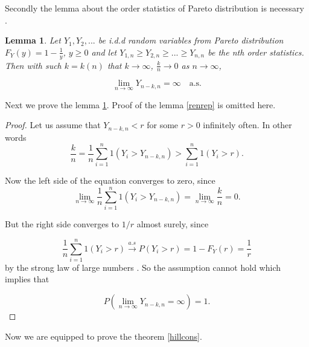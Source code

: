 \documentclass[english,12pt,a4paper,pdftex,sci,utf8]{aaltothesis} %
\newtheorem{lemma}[theorem]{Lemma}
\begin{document}
Secondly the lemma about the order statistics of Pareto distribution is necessary \cite{deHaan}.

\begin{lemma}
Let $Y_1, Y_2, ...$ be i.d.d random variables from Pareto distribution $F_Y(y)=1-\frac{1}{y}$, $y \geq 0$ and let $Y_{1,n} \geq Y_{2,n} \geq ... \geq Y_{n,n}$ be the nth order statistics. Then with such $k=k(n)$ that $k \rightarrow \infty$, $\frac{k}{n} \rightarrow 0$ as $n \rightarrow \infty$,

\begin{equation}
\lim_{n\to\infty} Y_{n-k,n} = \infty  \quad  \text{a.s}.
\end{equation}
\label{asconv}
\end{lemma}

Next we prove the lemma \ref{asconv}. Proof of the lemma \ref{renrep} is omitted here.

\begin{proof}
Let us assume that $Y_{n-k,n} < r$ for some $r > 0$ infinitely often. In other words
\begin{equation}
\frac{k}{n} = \frac{1}{n} \sum_{i=1}^{n} 1(Y_i>Y_{n-k,n}) > \sum_{i=1}^{n} 1(Y_i>r).
\end{equation}

Now the left side of the equation converges to zero, since
\begin{equation}
\lim_{n\to\infty} \frac{1}{n} \sum_{i=1}^{n} 1(Y_i>Y_{n-k,n}) = \lim_{n\to\infty} \frac{k}{n} =0.
\end{equation}

But the right side converges to $1/r$ almost surely, since

\begin{equation}
\frac{1}{n} \sum_{i=1}^{n} 1(Y_i>r) \xrightarrow{a.s} P(Y_i>r) = 1-F_Y(r) = \frac{1}{r}
\end{equation}
by the strong law of large numbers \cite{rosenthal}.
So the assumption cannot hold which implies that

\begin{equation}
P(\lim_{n\to\infty} Y_{n-k,n} = \infty)=1.
\end{equation}
\end{proof}

Now we are equipped to prove the theorem \ref{hillcons}.
\end{document}
